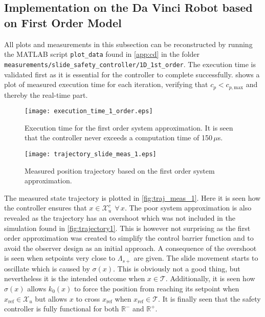 \subsection{Implementation on the Da Vinci Robot based on First Order Model}\label{subsec:implement-davinci-1d}
All plots and measurements in this subsection can be reconstructed by running the MATLAB script \texttt{plot\_data} found in \autoref{app:cd} in the folder \texttt{measurements/slide\_safety\_controller/1D\_1st\_order}. The execution time is validated first as it is essential for the controller to complete successfully.  shows a plot of measured execution time for each iteration, verifying that $c_p < c_{p,\text{max}}$ and thereby the real-time part.
\begin{figure}[H]
	\center
		\texttt{[image: execution\_time\_1\_order.eps]}
	\caption{Execution time for the first order system approximation. It is seen that the controller never exceeds a computation time of 150\,$\mu$s.}
	\label{fig:exe_1}
\end{figure}



\begin{figure}[htbp]
\hspace{-7mm}
		\texttt{[image: trajectory\_slide\_meas\_1.eps]}
	\caption{Measured position trajectory based on the first order system approximation.}
    \label{fig:traj_meas_1}
\end{figure}
The measured state trajectory is plotted in \autoref{fig:traj_meas_1}.
Here it is seen how the controller ensures that $x \in \mathcal{X}_u^c \ \ \forall \, x$. The poor system approximation is also revealed as the trajectory has an overshoot which was not included in the simulation found in \autoref{fig:trajectory1}. This is however not surprising as the first order approximation was created to simplify the control barrier function and to avoid the observer design as an initial approach. A consequence of the overshoot is seen when setpoints very close to $\Lambda_{s+}$ are given. The slide movement starts to oscillate which is caused by $\sigma(x)$. This is obviously not a good thing, but nevertheless it is the intended outcome when $x \in \mathcal{T}$. Additionally, it is seen how $\sigma(x)$ allows $k_0(x)$ to force the position from reaching its setpoint when $x_\text{ref} \in \mathcal{X}_u$ but allows $x$ to cross $x_\text{ref}$ when $x_\text{ref} \in \mathcal{T}$. %
It is finally seen that the safety controller is fully functional for both $\mathbb{R}^-$ and $\mathbb{R}^+$.


